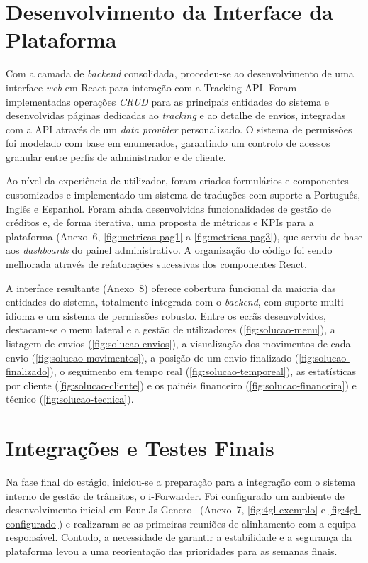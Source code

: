 \documentclass[a4paper,12pt]{report}
\begin{document}
\section{Desenvolvimento da Interface da Plataforma}

Com a camada de \textit{backend} consolidada, procedeu-se ao desenvolvimento de uma interface \textit{web} em React para interação com a Tracking API. Foram implementadas operações \textit{CRUD} para as principais entidades do sistema e desenvolvidas páginas dedicadas ao \textit{tracking} e ao detalhe de envios, integradas com a API através de um \textit{data provider} personalizado. O sistema de permissões foi modelado com base em enumerados, garantindo um controlo de acessos granular entre perfis de administrador e de cliente.

Ao nível da experiência de utilizador, foram criados formulários e componentes customizados e implementado um sistema de traduções com suporte a Português, Inglês e Espanhol. Foram ainda desenvolvidas funcionalidades de gestão de créditos e, de forma iterativa, uma proposta de métricas e KPIs para a plataforma (Anexo~6, \autoref{fig:metricas-pag1} a \autoref{fig:metricas-pag3}), que serviu de base aos \textit{dashboards} do painel administrativo. A organização do código foi sendo melhorada através de refatorações sucessivas dos componentes React.

A interface resultante (Anexo~8) oferece cobertura funcional da maioria das entidades do sistema, totalmente integrada com o \textit{backend}, com suporte multi-idioma e um sistema de permissões robusto. Entre os ecrãs desenvolvidos, destacam-se o menu lateral e a gestão de utilizadores (\autoref{fig:solucao-menu}), a listagem de envios (\autoref{fig:solucao-envios}), a visualização dos movimentos de cada envio (\autoref{fig:solucao-movimentos}), a posição de um envio finalizado (\autoref{fig:solucao-finalizado}), o seguimento em tempo real (\autoref{fig:solucao-temporeal}), as estatísticas por cliente (\autoref{fig:solucao-cliente}) e os painéis financeiro (\autoref{fig:solucao-financeira}) e técnico (\autoref{fig:solucao-tecnica}).

\section{Integrações e Testes Finais}

Na fase final do estágio, iniciou-se a preparação para a integração com o sistema interno de gestão de trânsitos, o i-Forwarder. Foi configurado um ambiente de desenvolvimento inicial em Four Js Genero~\cite{fourjs} (Anexo~7, \autoref{fig:4gl-exemplo} e \autoref{fig:4gl-configurado}) e realizaram-se as primeiras reuniões de alinhamento com a equipa responsável. Contudo, a necessidade de garantir a estabilidade e a segurança da plataforma levou a uma reorientação das prioridades para as semanas finais.
\end{document}
